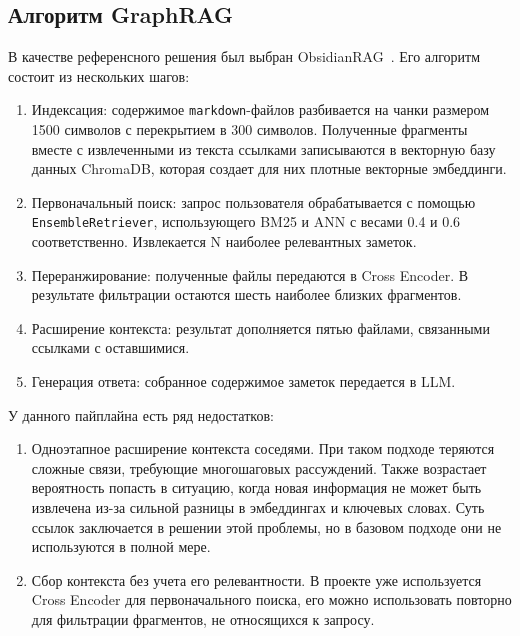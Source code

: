 \subsection{Алгоритм GraphRAG}

В качестве референсного решения был выбран ObsidianRAG~\cite{obsidianrag}.
Его алгоритм состоит из нескольких шагов:
\begin{enumerate}
      \item Индексация: содержимое \texttt{markdown}-файлов разбивается на чанки
            размером 1500 символов с перекрытием в 300 символов.
            Полученные фрагменты вместе с извлеченными из текста ссылками
            записываются в векторную базу данных ChromaDB,
            которая создает для них плотные векторные эмбеддинги.
      \item Первоначальный поиск: запрос пользователя обрабатывается
            с помощью \texttt{EnsembleRetriever}, использующего BM25 и ANN
            с весами 0.4 и 0.6 соответственно.
            Извлекается N наиболее релевантных заметок.
      \item Переранжирование: полученные файлы передаются в Cross Encoder.
            В результате фильтрации остаются шесть наиболее близких фрагментов.
      \item Расширение контекста: результат дополняется пятью файлами,
            связанными ссылками с оставшимися.
      \item Генерация ответа: собранное содержимое заметок
            передается в LLM.
\end{enumerate}

У данного пайплайна есть ряд недостатков:

\begin{enumerate}
      \item Одноэтапное расширение контекста соседями.
            При таком подходе теряются сложные связи, требующие многошаговых рассуждений.
            Также возрастает вероятность попасть в ситуацию,
            когда новая информация не может быть извлечена
            из-за сильной разницы в эмбеддингах и ключевых словах.
            Суть ссылок заключается в решении этой проблемы, но в базовом подходе они не используются в полной мере.
      \item Сбор контекста без учета его релевантности.
            В проекте уже используется Cross Encoder для первоначального поиска,
            его можно использовать повторно для фильтрации фрагментов, не относящихся к запросу.
\end{enumerate}

